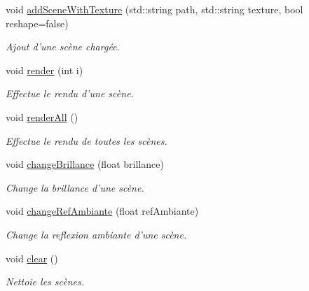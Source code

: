 \begin{DoxyCompactItemize}
void \hyperlink{class_modele_a83eaf9b1478a82d94819776682ca5fce}{add\+Scene\+With\+Texture} (std\+::string path, std\+::string texture, bool reshape=false)
\begin{DoxyCompactList}\small\item\em Ajout d'une scène chargée. \end{DoxyCompactList}\item 
void \hyperlink{class_modele_a8c611c3edf341892ceefebd9c3e00136}{render} (int i)
\begin{DoxyCompactList}\small\item\em Effectue le rendu d'une scène. \end{DoxyCompactList}\item 
void \hyperlink{class_modele_a78714b95cdb2f63e76c9e122f41e6bbd}{render\+All} ()
\begin{DoxyCompactList}\small\item\em Effectue le rendu de toutes les scènes. \end{DoxyCompactList}\item 
void \hyperlink{class_modele_af105ed94c8a03a7283b4099ef1855976}{change\+Brillance} (float brillance)
\begin{DoxyCompactList}\small\item\em Change la brillance d'une scène. \end{DoxyCompactList}\item 
void \hyperlink{class_modele_ab313a52585ff0db49e253b55ddbbc108}{change\+Ref\+Ambiante} (float ref\+Ambiante)
\begin{DoxyCompactList}\small\item\em Change la reflexion ambiante d'une scène. \end{DoxyCompactList}\item 
void \hyperlink{class_modele_a1f02ee40382488479be64890e53ea348}{clear} ()
\begin{DoxyCompactList}\small\item\em Nettoie les scènes. \end{DoxyCompactList}\end{DoxyCompactItemize}
